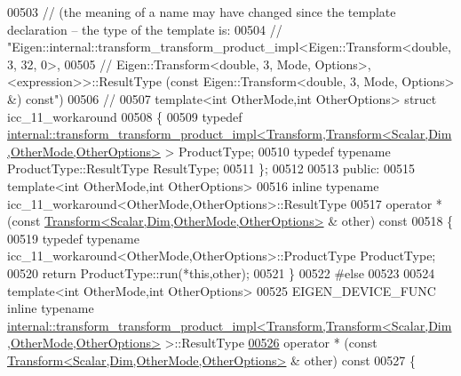 \begin{DoxyCode}
00503   \textcolor{comment}{//  (the meaning of a name may have changed since the template declaration -- the type of the template
       is:}
00504   \textcolor{comment}{// "Eigen::internal::transform\_transform\_product\_impl<Eigen::Transform<double, 3, 32, 0>,}
00505   \textcolor{comment}{//     Eigen::Transform<double, 3, Mode, Options>, <expression>>::ResultType (const
       Eigen::Transform<double, 3, Mode, Options> &) const")}
00506   \textcolor{comment}{// }
00507   \textcolor{keyword}{template}<\textcolor{keywordtype}{int} OtherMode,\textcolor{keywordtype}{int} OtherOptions> \textcolor{keyword}{struct }icc\_11\_workaround
00508   \{
00509     \textcolor{keyword}{typedef} 
      \hyperlink{struct_eigen_1_1internal_1_1transform__transform__product__impl}{internal::transform\_transform\_product\_impl<Transform,Transform<Scalar,Dim,OtherMode,OtherOptions>}
       > ProductType;
00510     \textcolor{keyword}{typedef} \textcolor{keyword}{typename} ProductType::ResultType ResultType;
00511   \};
00512   
00513 \textcolor{keyword}{public}:
00515   \textcolor{keyword}{template}<\textcolor{keywordtype}{int} OtherMode,\textcolor{keywordtype}{int} OtherOptions>
00516   \textcolor{keyword}{inline} \textcolor{keyword}{typename} icc\_11\_workaround<OtherMode,OtherOptions>::ResultType
00517     operator * (\textcolor{keyword}{const} \hyperlink{group___geometry___module_class_eigen_1_1_transform}{Transform<Scalar,Dim,OtherMode,OtherOptions>}
      & other)\textcolor{keyword}{ const}
00518 \textcolor{keyword}{  }\{
00519     \textcolor{keyword}{typedef} \textcolor{keyword}{typename} icc\_11\_workaround<OtherMode,OtherOptions>::ProductType ProductType;
00520     \textcolor{keywordflow}{return} ProductType::run(*\textcolor{keyword}{this},other);
00521   \}
00522 \textcolor{preprocessor}{  #else}
00523 
00524   \textcolor{keyword}{template}<\textcolor{keywordtype}{int} OtherMode,\textcolor{keywordtype}{int} OtherOptions>
00525   EIGEN\_DEVICE\_FUNC \textcolor{keyword}{inline} \textcolor{keyword}{typename} 
      \hyperlink{struct_eigen_1_1internal_1_1transform__transform__product__impl}{internal::transform\_transform\_product\_impl<Transform,Transform<Scalar,Dim,OtherMode,OtherOptions>}
       >::ResultType
\hyperlink{group___geometry___module_a20df28b0b153575133a8543fd215ff9d}{00526}     operator * (\textcolor{keyword}{const} \hyperlink{group___geometry___module_class_eigen_1_1_transform}{Transform<Scalar,Dim,OtherMode,OtherOptions>}
      & other)\textcolor{keyword}{ const}
00527 \textcolor{keyword}{  }\{

\end{DoxyCode}
